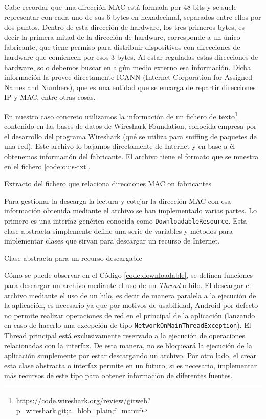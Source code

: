 Cabe recordar que una dirección MAC está formada por 48 bits y se suele representar con cada uno de sus 6 bytes en hexadecimal, separados entre ellos por dos puntos. Dentro de esta dirección de hardware, los tres primeros bytes, es decir la primera mitad de la dirección de hardware, corresponde a un único fabricante, que tiene permiso para distribuir dispositivos con direcciones de hardware que comiencen por esos 3 bytes. Al estar reguladas estas direcciones de hardware, solo debemos buscar en algún medio externo esa información. Dicha información la provee directamente ICANN (Internet Corporation for Assigned Names and Numbers), que es una entidad que se encarga de repartir direcciones IP y MAC, entre otras cosas.

En nuestro caso concreto utilizamos la información de un fichero de texto\footnote{\url{https://code.wireshark.org/review/gitweb?p=wireshark.git;a=blob_plain;f=manuf}} contenido en las bases de datos de Wireshark Foundation, conocida empresa por el desarrollo del programa Wireshark (qué se utiliza para sniffing de paquetes de una red). Este archivo lo bajamos directamente de Internet y en base a él obtenemos información del fabricante. El archivo tiene el formato que se muestra en el fichero \ref{code:ouis-txt}. 

\begin{code}
	\caption{Extracto del fichero que relaciona direcciones MAC on fabricantes}
	\label{code:ouis-txt}
	
\end{code}

Para gestionar la descarga la lectura y cotejar la dirección MAC con esa información obtenida mediante el archivo se han implementado varias partes. Lo primero es una interfaz genérica conocida como \texttt{DownloadableResource}. Esta clase abstracta simplemente define una serie de variables y métodos para implementar clases que sirvan para descargar un recurso de Internet.

\begin{code}
	\caption{Clase abstracta para un recurso descargable}
	\label{code:downloadable}
	
\end{code}

Cómo se puede observar en el Código \ref{code:downloadable}, se definen funciones para descargar un archivo mediante el uso de un \textit{Thread} o hilo. El descargar el archivo mediante el uso de un hilo, es decir de manera paralela a la ejecución de la aplicación, es necesario ya que por motivos de usabilidad, Android por defecto no permite realizar operaciones de red en el principal de la aplicación (lanzando en caso de hacerlo una excepción de tipo \texttt{NetworkOnMainThreadException}). El Thread principal está exclusivamente reservado a la ejecución de operaciones relacionadas con la interfaz. De esta manera, no se bloqueará la ejecución de la aplicación simplemente por estar descargando un archivo. 
Por otro lado, el crear esta clase abstracta o interfaz permite en un futuro, si es necesario, implementar más recursos de este tipo para obtener información de diferentes fuentes.

